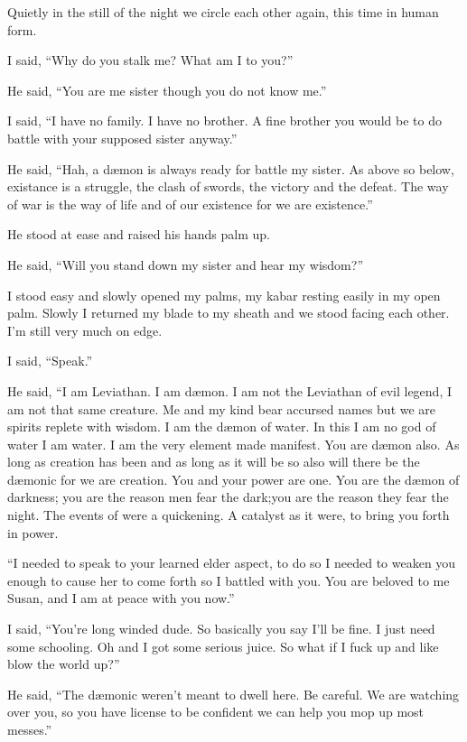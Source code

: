 \lettrine[lines=2,lraise=0]{Q}\space uietly in the still of the night we circle each other again, this time in human form.

I said, ``Why do you stalk me? What am I to you?''

He said, ``You are me sister though you do not know me.''

I said, ``I have no family. I have no brother. A fine brother you would be to do battle with your supposed sister anyway.''

He said, ``Hah, a d\ae mon is always ready for battle my sister. As above so below, existance is a struggle, the clash of swords, the victory and the defeat. The way of war is the way of life and of our existence for we are existence.''

He stood at ease and raised his hands palm up.

He said, ``Will you stand down my sister and hear my wisdom?''

I stood easy and slowly opened my palms, my kabar resting easily in my open palm. Slowly I returned my blade to my sheath and we stood facing each other. I'm still very much on edge.

I said, ``Speak.''

He said, ``I am Leviathan. I am d\ae mon. I am not the Leviathan of evil legend, I am not that same creature. Me and my kind bear accursed names but we are spirits replete with wisdom. I am the d\ae mon of water. In this I am no god of water I am water. I am the very element made manifest. You are d\ae mon also. As long as creation has been and as long as it will be so also will there be the d\ae monic for we are creation. You and your power are one. You are the d\ae mon of darkness; you are the reason men fear the dark;you are the reason they fear the night. The events of \chichenitza* were a quickening. A catalyst as it were, to bring you forth in power.

``I needed to speak to your learned elder aspect, to do so I needed to weaken you enough to cause her to come forth so I battled with you. You are beloved to me Susan, and I am at peace with you now.''

I said, ``You're long winded dude. So basically you say I'll be fine. I just need some schooling. Oh and I got some serious juice. So what if I fuck up and like blow the world up?''

He said, ``The d\ae monic weren't meant to dwell here. Be careful. We are watching over you, so you have license to be confident we can help you mop up most messes.''

